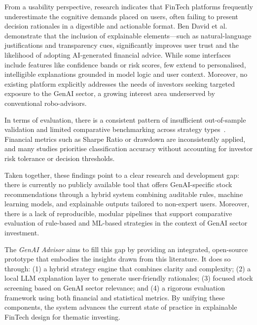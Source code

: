 From a usability perspective, research indicates that FinTech platforms frequently underestimate the cognitive demands placed on users, often failing to present decision rationales in a digestible and actionable format. Ben David et al.~\cite{bendavid2021explainable} demonstrate that the inclusion of explainable elements—such as natural-language justifications and transparency cues, significantly improves user trust and the likelihood of adopting AI-generated financial advice. While some interfaces include features like confidence bands or risk scores, few extend to personalised, intelligible explanations grounded in model logic and user context. Moreover, no existing platform explicitly addresses the needs of investors seeking targeted exposure to the GenAI sector, a growing interest area underserved by conventional robo-advisors.

In terms of evaluation, there is a consistent pattern of insufficient out-of-sample validation and limited comparative benchmarking across strategy types~\cite{bailey2014backtest, kaastra1996forecasting}. Financial metrics such as Sharpe Ratio or drawdown are inconsistently applied, and many studies prioritise classification accuracy without accounting for investor risk tolerance or decision thresholds.

Taken together, these findings point to a clear research and development gap: there is currently no publicly available tool that offers GenAI-specific stock recommendations through a hybrid system combining auditable rules, machine learning models, and explainable outputs tailored to non-expert users. Moreover, there is a lack of reproducible, modular pipelines that support comparative evaluation of rule-based and ML-based strategies in the context of GenAI sector investment.

The \textit{GenAI Advisor} aims to fill this gap by providing an integrated, open-source prototype that embodies the insights drawn from this literature. It does so through: (1) a hybrid strategy engine that combines clarity and complexity; (2) a local LLM explanation layer to generate user-friendly rationales; (3) focused stock screening based on GenAI sector relevance; and (4) a rigorous evaluation framework using both financial and statistical metrics. By unifying these components, the system advances the current state of practice in explainable FinTech design for thematic investing.
